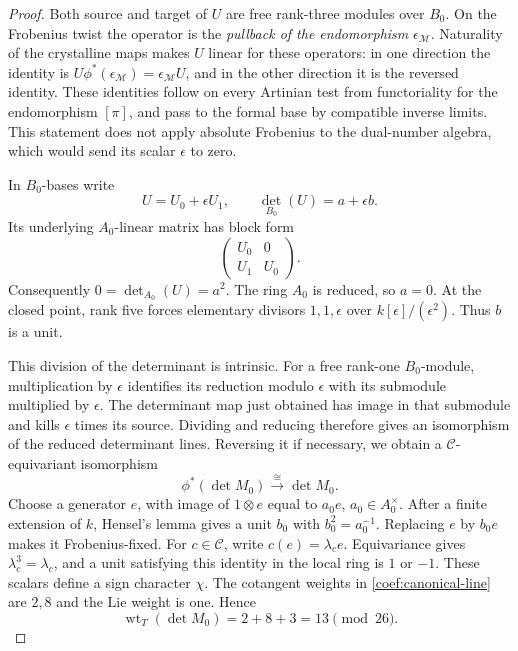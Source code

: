 \documentclass[11pt]{article}
\theoremstyle{definition}
\theoremstyle{remark}
\numberwithin{equation}{section}
\begin{document}
\begin{proof}
Both source and target of \(U\) are free rank-three modules over
\(B_0\).  On the Frobenius twist the operator is the
\emph{pullback of the endomorphism} \(\epsilon_{\mathcal M}\).
Naturality of the crystalline maps makes \(U\) linear for these
operators: in one direction the identity is
\(U\phi^*(\epsilon_{\mathcal M})=\epsilon_{\mathcal M}U\),
and in the other direction it is the reversed identity.
These identities follow on every Artinian test from functoriality
for the endomorphism \([\pi]\), and pass to the formal base by
compatible inverse limits.  This statement does not apply absolute Frobenius
to the dual-number algebra, which would send its scalar
\(\epsilon\) to zero.

In \(B_0\)-bases write
\[
 U=U_0+\epsilon U_1,\qquad
 \det_{B_0}(U)=a+\epsilon b.
\]
Its underlying \(A_0\)-linear matrix has block form
\[
 \begin{pmatrix}U_0&0\\ U_1&U_0\end{pmatrix}.
\]
Consequently \(0=\det_{A_0}(U)=a^2\).
The ring \(A_0\) is reduced, so \(a=0\).
At the closed point, rank five forces elementary divisors
\(1,1,\epsilon\) over \(k[\epsilon]/(\epsilon^2)\).
Thus \(b\) is a unit.

This division of the determinant is intrinsic.  For a free
rank-one \(B_0\)-module, multiplication by \(\epsilon\) identifies
its reduction modulo \(\epsilon\) with its submodule multiplied
by \(\epsilon\).  The determinant map just obtained has image
in that submodule and kills \(\epsilon\) times its source.
Dividing and reducing therefore gives an isomorphism of the
reduced determinant lines.  Reversing it if necessary, we obtain
a \(\mathcal C\)-equivariant isomorphism
\[
 \phi^*(\det M_0)\xrightarrow{\ \cong\ }\det M_0.
\]
Choose a generator \(e\), with image of \(1\otimes e\) equal
to \(a_0e\), \(a_0\in A_0^\times\).
After a finite extension of \(k\), Hensel's lemma gives a unit
\(b_0\) with \(b_0^2=a_0^{-1}\).
Replacing \(e\) by \(b_0e\) makes it Frobenius-fixed.
For \(c\in\mathcal C\), write \(c(e)=\lambda_c e\).
Equivariance gives \(\lambda_c^3=\lambda_c\), and a unit
satisfying this identity in the local ring is \(1\) or \(-1\).
These scalars define a sign character \(\chi\).
The cotangent weights in \eqref{coef:canonical-line} are \(2,8\)
and the Lie weight is one.  Hence
\[
 \operatorname{wt}_T(\det M_0)=2+8+3=13\pmod{26}.
\]


\end{proof}
\end{document}
